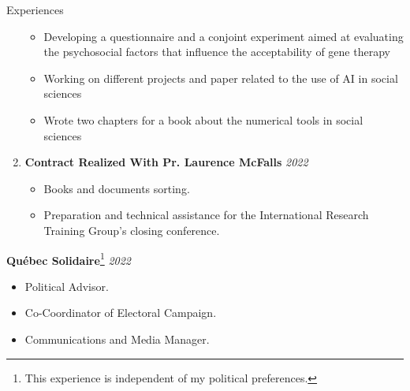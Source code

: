 \documentclass{resume} %
\begin{document}
\begin{rSection}{Experiences}
\begin{enumerate}
\begin{itemize}
            \item Developing a questionnaire and a conjoint experiment aimed at evaluating the psychosocial factors that influence the acceptability of gene therapy
            \item Working on different projects and paper related to the use of AI in social sciences
            \item Wrote two chapters for a book about the numerical tools in social sciences
        \end{itemize}
    \item \textbf{Contract Realized With Pr. Laurence McFalls} \hfill {\em 2022}
        \begin{itemize}
            \item Books and documents sorting.
            \item Preparation and technical assistance for the International Research Training Group's closing conference.
        \end{itemize}
\end{enumerate}

{\bf Québec Solidaire}\footnote{This experience is independent of my political preferences.}  \hfill {\em 2022}
\begin{itemize}
    \item Political Advisor.
    \item Co-Coordinator of Electoral Campaign.
    \item Communications and Media Manager.
\end{itemize}

\end{rSection}

\end{document}
